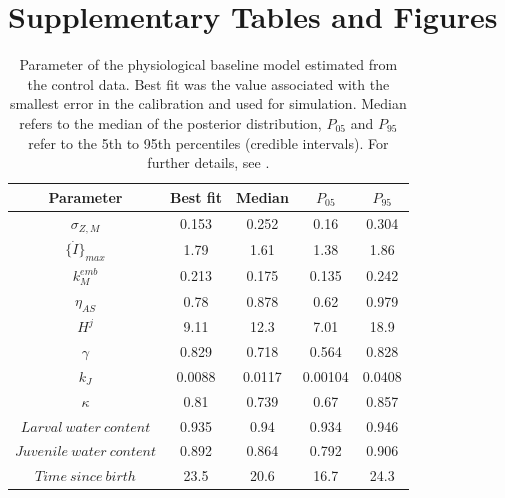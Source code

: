 \documentclass[utf8]{frontiers_suppmat} %
\begin{document}
\onecolumn
{}

\title[Supplementary Material]{{}}

\maketitle

\section{Supplementary Tables and Figures}

\renewcommand{\thetable}{A\arabic{table}}
\setcounter{table}{0}

\begin{table}[h]
    \caption{Parameter of the physiological baseline model estimated from the control data. 
    Best fit was the value associated with the smallest error in the calibration and used for simulation.
    Median refers to the median of the posterior distribution, $P_{05}$ and $P_{95}$ refer to the 5th to 95th percentiles 
    (credible intervals).
    For further details, see \citet{hansulDynamicEnergyBudget2026}.}
    \label{tab:deb_params}
    \begin{tabular}{ccccc}
    Parameter & Best fit & Median & $P_{05}$ & $P_{95}$\\
    \hline
    $\sigma_{Z,M}$ & 0.153 & 0.252 & 0.16 & 0.304\\
    $\{ \dot{I} \}_{max}$ & 1.79 & 1.61 & 1.38 & 1.86\\
    $k_M^{emb}$ & 0.213 & 0.175 & 0.135 & 0.242\\
    $\eta_{AS}$ & 0.78 & 0.878 & 0.62 & 0.979\\
    $H^{j}$ & 9.11 & 12.3 & 7.01 & 18.9\\
    $\gamma$ & 0.829 & 0.718 & 0.564 & 0.828\\
    $k_J$ & 0.0088 & 0.0117 & 0.00104 & 0.0408\\
    $\kappa$ & 0.81 & 0.739 & 0.67 & 0.857\\
    $Larval\ water\ content$ & 0.935 & 0.94 & 0.934 & 0.946\\
    $Juvenile\ water\ content$ & 0.892 & 0.864 & 0.792 & 0.906\\
    $Time\ since\ birth$ & 23.5 & 20.6 & 16.7 & 24.3\\
    \end{tabular}
\end{table}

\end{document}
